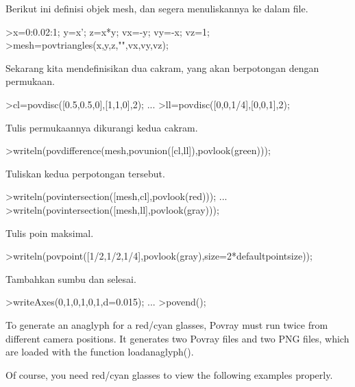 \begin{eulercomment}
\begin{eulercomment}
Berikut ini definisi objek mesh, dan segera menuliskannya ke dalam
file.
\end{eulercomment}
\begin{eulerprompt}
>x=0:0.02:1; y=x'; z=x*y; vx=-y; vy=-x; vz=1;
>mesh=povtriangles(x,y,z,"",vx,vy,vz);
\end{eulerprompt}
\begin{eulercomment}
Sekarang kita mendefinisikan dua cakram, yang akan berpotongan dengan
permukaan.
\end{eulercomment}
\begin{eulerprompt}
>cl=povdisc([0.5,0.5,0],[1,1,0],2); ...
>ll=povdisc([0,0,1/4],[0,0,1],2);
\end{eulerprompt}
\begin{eulercomment}
Tulis permukaannya dikurangi kedua cakram.
\end{eulercomment}
\begin{eulerprompt}
>writeln(povdifference(mesh,povunion([cl,ll]),povlook(green)));
\end{eulerprompt}
\begin{eulercomment}
Tuliskan kedua perpotongan tersebut.
\end{eulercomment}
\begin{eulerprompt}
>writeln(povintersection([mesh,cl],povlook(red))); ...
>writeln(povintersection([mesh,ll],povlook(gray)));
\end{eulerprompt}
\begin{eulercomment}
Tulis poin maksimal.
\end{eulercomment}
\begin{eulerprompt}
>writeln(povpoint([1/2,1/2,1/4],povlook(gray),size=2*defaultpointsize));
\end{eulerprompt}
\begin{eulercomment}
Tambahkan sumbu dan selesai.
\end{eulercomment}
\begin{eulerprompt}
>writeAxes(0,1,0,1,0,1,d=0.015); ...
>povend();
\end{eulerprompt}
\begin{eulercomment}
To generate an anaglyph for a red/cyan glasses, Povray must run twice
from different camera positions. It generates two Povray files and two
PNG files, which are loaded with the function loadanaglyph().

Of course, you need red/cyan glasses to view the following examples
properly.


\end{eulercomment}
\end{eulercomment}
